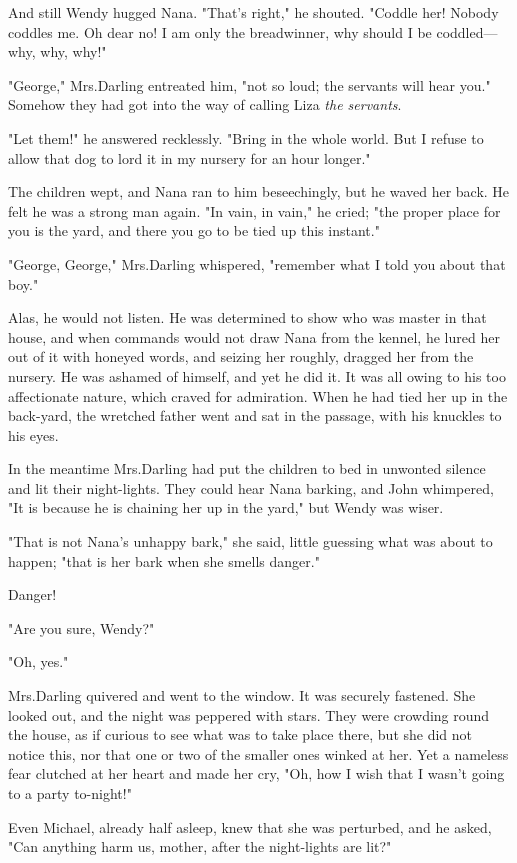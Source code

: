 And still Wendy hugged Nana.
"That's right," he shouted.
"Coddle her!
Nobody coddles me.
Oh dear no!
I am only the breadwinner, why should I be coddled—why, why, why!"

"George," Mrs.\@ Darling entreated him, "not so loud;
the servants will hear you."
Somehow they had got into the way of calling Liza \emph{the servants}.

"Let them!\@" he answered recklessly.
"Bring in the whole world.
But I refuse to allow that dog to lord it in my nursery for an hour longer."

The children wept, and Nana ran to him beseechingly, but he waved her back.
He felt he was a strong man again.
"In vain, in vain," he cried;
"the proper place for you is the yard,
and there you go to be tied up this instant."

"George, George," Mrs.\@ Darling whispered, "remember what I told you about that boy."

Alas, he would not listen.
He was determined to show who was master in that house,
and when commands would not draw Nana from the kennel,
he lured her out of it with honeyed words,
and seizing her roughly, dragged her from the nursery.
He was ashamed of himself, and yet he did it.
It was all owing to his too affectionate nature,
which craved for admiration.
When he had tied her up in the back-yard,
the wretched father went and sat in the passage,
with his knuckles to his eyes.

In the meantime Mrs.\@ Darling had put the children to bed in unwonted silence and lit their night-lights.
They could hear Nana barking,
and John whimpered, "It is because he is chaining her up in the yard," but Wendy was wiser.

"That is not Nana's unhappy bark," she said,
little guessing what was about to happen;
"that is her bark when she smells danger."

Danger!

"Are you sure, Wendy?"

"Oh, yes."

Mrs.\@ Darling quivered and went to the window.
It was securely fastened.
She looked out, and the night was peppered with stars.
They were crowding round the house,
as if curious to see what was to take place there,
but she did not notice this,
nor that one or two of the smaller ones winked at her.
Yet a nameless fear clutched at her heart and made her cry,
"Oh, how I wish that I wasn't going to a party to-night!"

Even Michael, already half asleep, knew that she was perturbed,
and he asked, "Can anything harm us, mother, after the night-lights are lit?"

